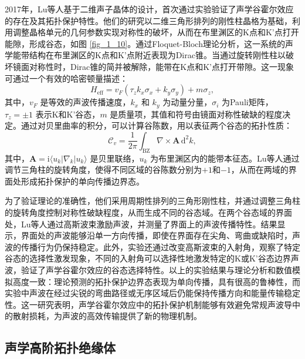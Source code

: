 2017年，Lu等人基于二维声子晶体的设计，首次通过实验验证了声学谷霍尔效应的存在及其拓扑保护特性\cite{i3}。他们的研究以二维三角形排列的刚性柱晶格为基础，利用调整晶格单元的几何参数实现对称性的破坏，从而在布里渊区的K点和K'点打开能隙，形成谷态，如图 \ref{fig_1_10}。通过Floquet-Bloch理论分析，这一系统的声学能带结构在布里渊区的K点和K'点附近表现为Dirac锥。当通过旋转刚性柱以破坏镜面对称性时，Dirac锥的简并被解除，能带在K点和K'点打开带隙。这一现象可通过一个有效的哈密顿量描述：
\begin{equation} \label{eq1-13}
    H_{\text{eff}} = v_F (\tau_z k_x \sigma_x + k_y \sigma_y) + m \sigma_z,
\end{equation}
其中，\(v_F\) 是等效的声波传播速度，\(k_x\) 和 \(k_y\) 为动量分量，\(\sigma_i\) 为Pauli矩阵，\(\tau_z = \pm 1\) 表示K和K'谷态，\(m\) 是质量项，其值和符号由镜面对称性破缺的程度决定。通过对贝里曲率的积分，可以计算谷陈数，用以表征两个谷态的拓扑性质：
\begin{equation} \label{eq1-14}
    \mathcal{C}_v = \frac{1}{2\pi} \int_{\text{BZ}} \nabla \times \mathbf{A} \, \mathrm{d}^2k,
\end{equation}
其中，\(\mathbf{A} = \mathrm{i} \langle u_k | \nabla_k | u_k \rangle\) 是贝里联络，\(u_k\) 为布里渊区内的能带本征态。Lu等人通过调节三角柱的旋转角度，使得不同区域的谷陈数分别为\(+1\)和\(-1\)，从而在两域的界面处形成拓扑保护的单向传播边界态。

为了验证理论的准确性，他们采用周期性排列的三角形刚性柱，并通过调整三角柱的旋转角度控制对称性破缺程度，从而生成不同的谷态域。在两个谷态域的界面处，Lu等人通过高斯波束激励声波，并测量了界面上的声波传播特性。结果显示，界面处的声波能够沿单一方向传播，即使在界面存在尖角、弯曲或缺陷时，声波的传播行为仍保持稳定。此外，实验还通过改变高斯波束的入射角，观察了特定谷态的选择性激发现象，不同的入射角可以选择性地激发特定的K或K'谷态边界声波，验证了声学谷霍尔效应的谷态选择特性。以上的实验结果与理论分析和数值模拟高度一致：理论预测的拓扑保护边界态表现为单向传播，具有很高的鲁棒性，而实验中声波在经过尖锐的弯曲路径或无序区域后仍能保持传播方向和能量传输稳定性。这一研究表明，声学谷霍尔效应中的拓扑保护机制能够有效避免常规声波导中的散射损耗，为声波的高效传输提供了新的物理机制。

\subsection{声学高阶拓扑绝缘体}

